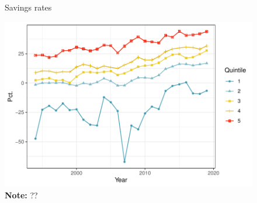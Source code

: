 \begin{figure}[H]
\centering
\caption{Savings rates}
\label{fig:savings}
\includegraphics[width=.8\textwidth]{Figures/savings.pdf}
\captionsetup{singlelinecheck=off,size=scriptsize}
\setlength{\captionmargin}{10pt}
\caption*{
\textbf{Note:} ??\\}
\end{figure}

